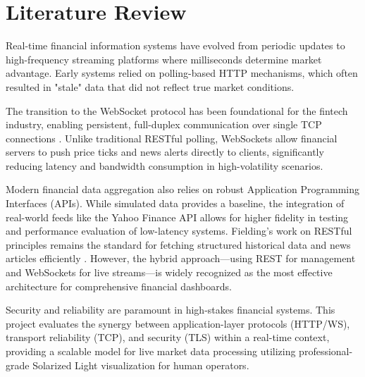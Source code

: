 \chapter{Literature Review}

Real-time financial information systems have evolved from periodic updates to high-frequency streaming platforms where milliseconds determine market advantage. Early systems relied on polling-based HTTP mechanisms, which often resulted in "stale" data that did not reflect true market conditions.

The transition to the WebSocket protocol has been foundational for the fintech industry, enabling persistent, full-duplex communication over single TCP connections \cite{websocket_rfc}. Unlike traditional RESTful polling, WebSockets allow financial servers to push price ticks and news alerts directly to clients, significantly reducing latency and bandwidth consumption in high-volatility scenarios.

Modern financial data aggregation also relies on robust Application Programming Interfaces (APIs). While simulated data provides a baseline, the integration of real-world feeds like the Yahoo Finance API allows for higher fidelity in testing and performance evaluation of low-latency systems. Fielding’s work on RESTful principles remains the standard for fetching structured historical data and news articles efficiently \cite{fielding}. However, the hybrid approach—using REST for management and WebSockets for live streams—is widely recognized as the most effective architecture for comprehensive financial dashboards.

Security and reliability are paramount in high-stakes financial systems. This project evaluates the synergy between application-layer protocols (HTTP/WS), transport reliability (TCP), and security (TLS) within a real-time context, providing a scalable model for live market data processing utilizing professional-grade Solarized Light visualization for human operators.